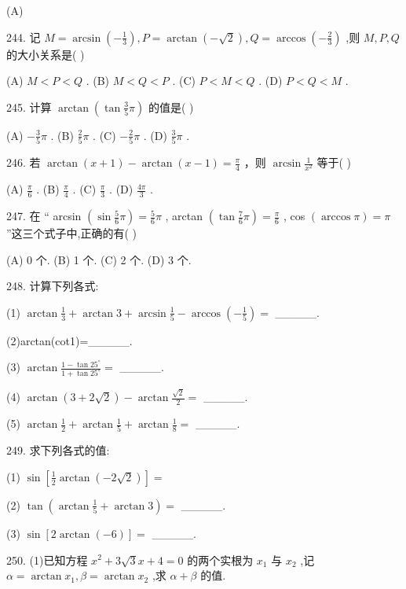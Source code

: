 \documentclass[10pt]{article}
\newcommand*\circled[1]{\tikz[baseline=(char.base)]{\node[shape=circle,draw,inner sep=1.5pt] (char) {\small #1};}}
\begin{document}
(A)

244. 记 \(M = \arcsin \left( {-\frac{1}{3}}\right) ,P = \arctan \left( {-\sqrt{2}}\right) ,Q = \arccos \left( {-\frac{2}{3}}\right)\) ,则 \(M,P,Q\) 的大小关系是( )

(A) \(M < P < Q\) . (B) \(M < Q < P\) . (C) \(P < M < Q\) . (D) \(P < Q < M\) .

245. 计算 \(\arctan \left( {\tan \frac{3}{5}\pi }\right)\) 的值是( )

(A) \(- \frac{3}{5}\pi\) . (B) \(\frac{2}{5}\pi\) . (C) \(- \frac{2}{5}\pi\) . (D) \(\frac{3}{5}\pi\) .

246. 若 \(\arctan \left( {x + 1}\right)  - \arctan \left( {x - 1}\right)  = \frac{\pi }{4}\) ，则 \(\arcsin \frac{1}{{x}^{2}}\) 等于( )

(A) \(\frac{\pi }{6}\) . (B) \(\frac{\pi }{4}\) . (C) \(\frac{\pi }{3}\) . (D) \(\frac{4\pi }{3}\) .

247. 在 “ \circled{1} arcsin \(\left( {\sin \frac{5}{6}\pi }\right)  = \frac{5}{6}\pi\) , \circled{2} arctan \(\left( {\tan \frac{7}{6}\pi }\right)  = \frac{\pi }{6}\) , \circled{3} cos \(\left( {\arccos \pi }\right)  = \pi\) ”这三个式子中,正确的有( )

(A) 0 个. (B) 1 个. (C) 2 个. (D) 3 个.

248. 计算下列各式:

(1) \(\arctan \frac{1}{3} + \arctan 3 + \arcsin \frac{1}{5} - \arccos \left( {-\frac{1}{5}}\right)  =\) \_\_\_\_\_.

(2)arctan(cot1)=\_\_\_\_\_.

(3) \(\arctan \frac{1 - \tan {25}^{ \circ  }}{1 + \tan {25}^{ \circ  }} =\) \_\_\_\_\_.

(4) \(\arctan \left( {3 + 2\sqrt{2}}\right)  - \arctan \frac{\sqrt{2}}{2} =\) \_\_\_\_\_.

(5) \(\arctan \frac{1}{2} + \arctan \frac{1}{5} + \arctan \frac{1}{8} =\) \_\_\_\_\_.

249. 求下列各式的值:

(1) \(\sin \left\lbrack  {\frac{1}{2}\arctan \left( {-2\sqrt{2}}\right) }\right\rbrack   =\)

(2) \(\tan \left( {\arctan \frac{1}{5} + \arctan 3}\right)  =\) \_\_\_\_\_.

(3) \(\sin \left\lbrack  {2\arctan \left( {-6}\right) }\right\rbrack   =\) \_\_\_\_\_.

250. (1)已知方程 \({x}^{2} + 3\sqrt{3}x + 4 = 0\) 的两个实根为 \({x}_{1}\) 与 \({x}_{2}\) ,记 \(\alpha  = \arctan {x}_{1},\beta  = \arctan {x}_{2}\) ,求 \(\alpha  + \beta\) 的值.
\end{document}
